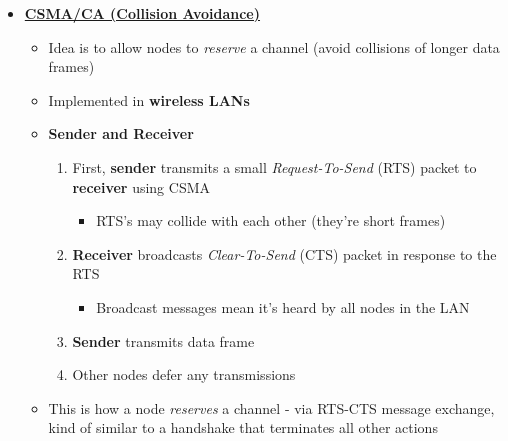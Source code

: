\documentclass{article}
\begin{document}
\begin{itemize}
    \item \textbf{\underline{CSMA/CA (Collision Avoidance)}}
    \begin{itemize}
        \item Idea is to allow nodes to \textit{reserve} a channel (avoid collisions of longer
        data frames)
        \item Implemented in \textbf{wireless LANs}
        \item \textbf{Sender and Receiver} 
        \begin{enumerate}
            \item First, \textbf{sender} transmits a small \textit{Request-To-Send} (RTS) 
            packet to \textbf{receiver} using CSMA
            \begin{itemize}
                \item RTS's may collide with each other (they're short frames)
            \end{itemize}
            \item \textbf{Receiver} broadcasts \textit{Clear-To-Send} (CTS) packet in response to
            the RTS
            \begin{itemize}
                \item Broadcast messages mean it's heard by all nodes in the LAN
            \end{itemize}
            \item \textbf{Sender} transmits data frame
            \item Other nodes defer any transmissions
        \end{enumerate}
        \item This is how a node \textit{reserves} a channel - via RTS-CTS message exchange, kind
        of similar to a handshake that terminates all other actions
    \end{itemize}
\end{itemize}

\end{document}
